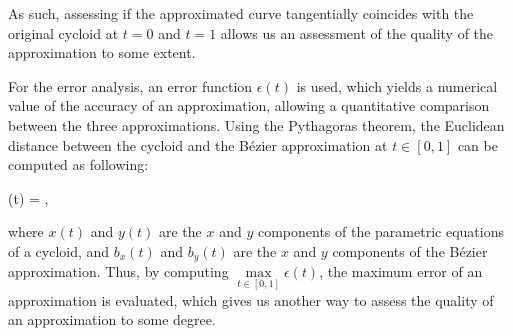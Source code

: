 \documentclass[12pt, oneside, appendixprefix=Appendix]{article}
\theoremstyle{definition}
\newenvironment{equation_numbered}
{\begin{spacing}{1.0} \begin{equation}}
{\end{equation}\end{spacing}}
\numberwithin{figure}{section}
\begin{document}
\noindent As such, assessing if the approximated curve tangentially coincides with the original cycloid at $t=0$ and $t=1$ allows us an assessment of the quality of the approximation to some extent.

For the error analysis, an error function $\epsilon (t)$ is used, which yields a numerical value of the accuracy of an approximation, allowing a quantitative comparison between the three approximations. Using the Pythagoras theorem, the Euclidean distance between the cycloid and the B\'ezier approximation at $t \in [0,1]$ can be computed as following:

\begin{equation_numbered}
\epsilon (t) = ,
\end{equation_numbered}

\noindent where $x(t)$ and $y(t)$ are the $x$ and $y$ components of the parametric equations of a cycloid, and $b_x(t)$ and $b_y(t)$ are the $x$ and $y$ components of the B\'ezier approximation. Thus, by computing $\max\limits_{t \in [0, 1]} \epsilon (t)$, the maximum error of an approximation is evaluated, which gives us another way to assess the quality of an approximation to some degree.
\end{document}
